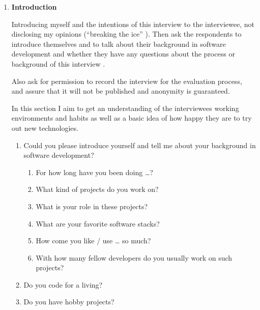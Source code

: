 \begin{enumerate}

	\item \textbf{Introduction}

	Introducing myself and the intentions of this interview to the interviewee, not disclosing my opinions (\enquote{breaking the ice} \cite[p. 83]{berg01}). Then ask the respondents to introduce themselves and to talk about their background in software development and whether they have any questions about the process or background of this interview \cite[p. 83]{berg01}.

	Also ask for permission to record the interview for the evaluation process, and assure that it will not be published and anonymity is guaranteed.

	In this section I aim to get an understanding of the interviewees working environments and habits as well as a basic idea of how happy they are to try out new technologies.

	\begin{enumerate}

		\item Could you please introduce yourself and tell me about your background in software development?

		\begin{enumerate}

			\item For how long have you been doing …?

			\item What kind of projects do you work on?

			\item What is your role in these projects?

			\item What are your favorite software stacks?

			\item How come you like / use … so much?

			\item With how many fellow developers do you usually work on such projects?

		\end{enumerate}

		\item Do you code for a living?

		\item Do you have hobby projects?

	\end{enumerate}


\end{enumerate}
